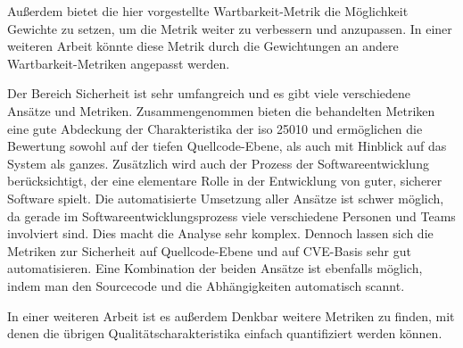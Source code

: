 \documentclass[12pt, a4paper, ngerman]{article}
\begin{document}
Außerdem bietet die hier vorgestellte Wartbarkeit-Metrik 
die Möglichkeit Gewichte zu setzen, 
um die Metrik weiter zu verbessern und anzupassen.
In einer weiteren Arbeit könnte diese Metrik durch
die Gewichtungen an andere Wartbarkeit-Metriken angepasst werden.

Der Bereich Sicherheit ist sehr umfangreich und es gibt viele verschiedene Ansätze und Metriken.
Zusammengenommen bieten die behandelten Metriken eine gute Abdeckung der Charakteristika der \ac{iso} 25010 und 
ermöglichen die Bewertung sowohl auf der tiefen Quellcode-Ebene, als auch mit Hinblick auf das System als ganzes.
Zusätzlich wird auch der Prozess der Softwareentwicklung berücksichtigt, 
der eine elementare Rolle in der Entwicklung von guter, sicherer Software spielt. 
Die automatisierte Umsetzung aller Ansätze ist schwer möglich, 
da gerade im Softwareentwicklungsprozess viele verschiedene Personen und Teams involviert sind.
Dies macht die Analyse sehr komplex.
Dennoch lassen sich die Metriken zur Sicherheit auf Quellcode-Ebene und auf CVE-Basis sehr gut automatisieren.
Eine Kombination der beiden Ansätze ist ebenfalls möglich, indem man den Sourcecode und die Abhängigkeiten automatisch scannt. 

In einer weiteren Arbeit ist es außerdem Denkbar weitere Metriken zu finden,
mit denen die übrigen Qualitätscharakteristika 
einfach quantifiziert werden können.


\newpage
\printbibliography
\end{document}
